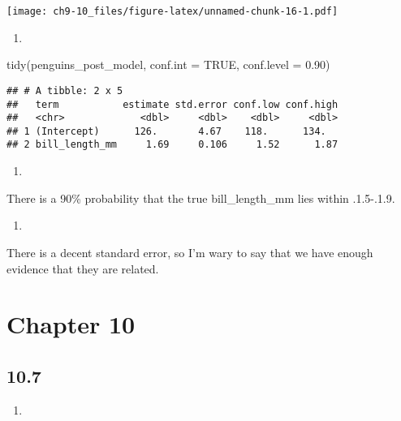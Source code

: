 \documentclass[
]{article}
\newenvironment{Shaded}{\begin{snugshade}}{\end{snugshade}}
\newcommand{\AttributeTok}[1]{\textcolor[rgb]{0.77,0.63,0.00}{#1}}
\newcommand{\ConstantTok}[1]{\textcolor[rgb]{0.00,0.00,0.00}{#1}}
\newcommand{\FloatTok}[1]{\textcolor[rgb]{0.00,0.00,0.81}{#1}}
\newcommand{\FunctionTok}[1]{\textcolor[rgb]{0.00,0.00,0.00}{#1}}
\newcommand{\NormalTok}[1]{#1}
\providecommand{\tightlist}{%
  \setlength{\itemsep}{0pt}\setlength{\parskip}{0pt}}
\begin{document}
\texttt{[image: ch9-10\_files/figure-latex/unnamed-chunk-16-1.pdf]}

\begin{enumerate}
\def\labelenumi{\alph{enumi}.}
\setcounter{enumi}{2}
\tightlist
\item
\end{enumerate}

\begin{Shaded}
\begin{Highlighting}[]
\FunctionTok{tidy}\NormalTok{(penguins\_post\_model, }\AttributeTok{conf.int =} \ConstantTok{TRUE}\NormalTok{, }\AttributeTok{conf.level =} \FloatTok{0.90}\NormalTok{)}
\end{Highlighting}
\end{Shaded}

\begin{verbatim}
## # A tibble: 2 x 5
##   term           estimate std.error conf.low conf.high
##   <chr>             <dbl>     <dbl>    <dbl>     <dbl>
## 1 (Intercept)      126.       4.67    118.      134.  
## 2 bill_length_mm     1.69     0.106     1.52      1.87
\end{verbatim}

\begin{enumerate}
\def\labelenumi{\alph{enumi}.}
\setcounter{enumi}{3}
\tightlist
\item
\end{enumerate}

There is a 90\% probability that the true bill\_length\_mm lies within
.1.5-.1.9.

\begin{enumerate}
\def\labelenumi{\alph{enumi}.}
\setcounter{enumi}{4}
\tightlist
\item
\end{enumerate}

There is a decent standard error, so I'm wary to say that we have enough
evidence that they are related.

\hypertarget{chapter-10}{%
\section{Chapter 10}\label{chapter-10}}

\hypertarget{section-7}{%
\subsection{10.7}\label{section-7}}

\begin{enumerate}
\def\labelenumi{\alph{enumi}.}
\tightlist
\item
\end{enumerate}
\end{document}
